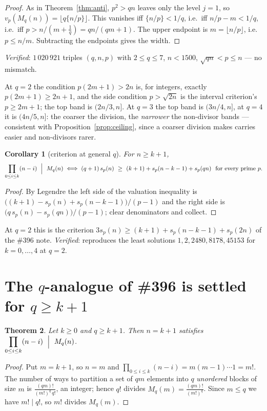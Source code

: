 \documentclass[11pt]{article}
\newtheorem{theorem}{Theorem}
\newtheorem{corollary}[theorem]{Corollary}
\begin{document}
\begin{proof}
As in Theorem~\ref{thm:anti}, $p^{2}>qn$ leaves only the level $j=1$, so
$v_p(M_q(n))=\lfloor q\{n/p\}\rfloor$.  This vanishes iff $\{n/p\}<1/q$, i.e.\ iff
$n/p-m<1/q$, i.e.\ iff $p>n/(m+\tfrac1q)=qn/(qm+1)$.  The upper endpoint is
$m=\lfloor n/p\rfloor$, i.e.\ $p\le n/m$.  Subtracting the endpoints gives the width.
\end{proof}

\emph{Verified}: $1\,020\,921$ triples $(q,n,p)$ with $2\le q\le7$, $n<1500$,
$\sqrt{qn}<p\le n$ --- no mismatch.

At $q=2$ the condition $p(2m+1)>2n$ is, for integers, exactly $p(2m+1)\ge2n+1$, and the
side condition $p>\sqrt{2n}$ is the interval criterion's $p\ge2m+1$; the top band is
$(2n/3,n]$.  At $q=3$ the top band is $(3n/4,n]$, at $q=4$ it is $(4n/5,n]$: the coarser the
division, the \emph{narrower} the non-divisor bands --- consistent with
Proposition~\ref{prop:ceiling}, since a coarser division makes carries easier and
non-divisors rarer.

\begin{corollary}[criterion at general $q$]\label{cor:crit}
For $n\ge k+1$,
\[
  \prod_{0\le i\le k}(n-i)\ \Bigm|\ M_q(n)
  \iff
  (q+1)\,s_p(n)\ \ge\ (k+1)+s_p(n-k-1)+s_p(qn)\ \ \text{for every prime }p .
\]
\end{corollary}

\begin{proof}
By Legendre the left side of the valuation inequality is
$\bigl((k+1)-s_p(n)+s_p(n-k-1)\bigr)/(p-1)$ and the right side is
$\bigl(q\,s_p(n)-s_p(qn)\bigr)/(p-1)$; clear denominators and collect.
\end{proof}

At $q=2$ this is the criterion $3s_p(n)\ge(k+1)+s_p(n-k-1)+s_p(2n)$ of the \#396 note.
\emph{Verified}: reproduces the least solutions $1,2,2480,8178,45153$ for $k=0,\dots,4$ at
$q=2$.

\section{The $q$-analogue of \#396 is settled for $q\ge k+1$}

\begin{theorem}\label{thm:qge}
Let $k\ge0$ and $q\ge k+1$.  Then $n=k+1$ satisfies
$\displaystyle\prod_{0\le i\le k}(n-i)\ \Bigm|\ M_q(n)$.
\end{theorem}

\begin{proof}
Put $m=k+1$, so $n=m$ and $\prod_{0\le i\le k}(n-i)=m(m-1)\cdots1=m!$.  The number of ways to
partition a set of $qm$ elements into $q$ \emph{unordered} blocks of size $m$ is
$\frac{(qm)!}{(m!)^{q}\,q!}$, an integer; hence $q!$ divides $M_q(m)=\frac{(qm)!}{(m!)^{q}}$.
Since $m\le q$ we have $m!\mid q!$, so $m!$ divides $M_q(m)$.
\end{proof}
\end{document}

